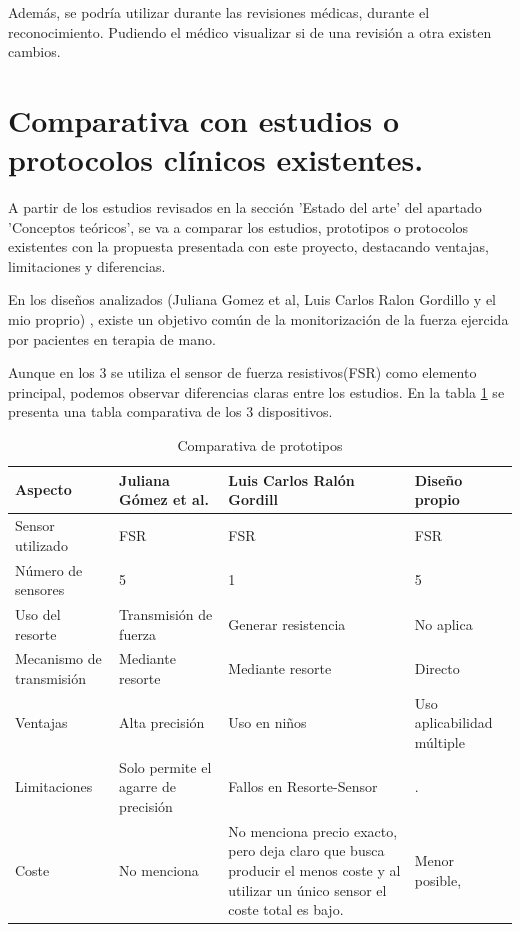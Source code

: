 Además, se podría utilizar durante las revisiones médicas, durante el reconocimiento. Pudiendo el médico visualizar si de una revisión a otra existen cambios. 

\section{ Comparativa con estudios o protocolos clínicos existentes.}

A partir de los estudios revisados en la sección 'Estado del arte' del apartado 'Conceptos teóricos', se va a comparar los estudios, prototipos o protocolos existentes con la propuesta presentada con este proyecto, destacando ventajas, limitaciones y diferencias.

En los diseños analizados (Juliana Gomez et al, Luis Carlos Ralon Gordillo y el mio proprio) , existe un objetivo común de la monitorización de la fuerza ejercida por pacientes en terapia de mano. 

Aunque en los 3 se utiliza el sensor de fuerza resistivos(FSR) como elemento principal, podemos observar diferencias claras entre los estudios. En la tabla \ref{tab:comparativa_prototipos} se presenta una tabla comparativa de los 3 dispositivos.
\begin{table}[h]
    \begin{tabular}{|p{2cm}|p{4cm}|p{4cm}|p{4cm}|}
    \hline
    \rowcolor[HTML]{BFBFBF} 
    \textbf{Aspecto} & \textbf{Juliana Gómez et al.} & \textbf{Luis Carlos Ralón Gordill}& \textbf{Diseño propio} \\ \hline
    Sensor utilizado & FSR & FSR & FSR \\ \hline
    Número de sensores & 5 & 1 & 5 \\ \hline
    Uso del resorte & Transmisión de fuerza & Generar resistencia & No aplica \\ \hline
    Mecanismo de transmisión & Mediante resorte & Mediante resorte& Directo \\ \hline
    Ventajas & Alta precisión & Uso en niños & Uso aplicabilidad múltiple\\ \hline
    Limitaciones & Solo permite el agarre de precisión & Fallos en Resorte-Sensor & . \\ \hline
    Coste  & No menciona & No menciona precio exacto, pero deja claro que busca producir el menos coste y al utilizar un único sensor el coste total es bajo. & Menor posible,  \\ \hline
    \end{tabular}
    \caption{Comparativa de prototipos}
    \label{tab:comparativa_prototipos}
\end{table}

